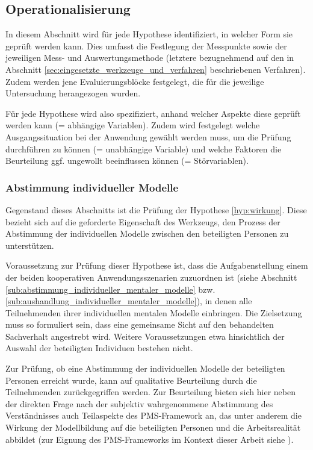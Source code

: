 \subsection{Operationalisierung} %
\label{sub:a_operationalisierung}

In diesem Abschnitt wird für jede Hypothese identifiziert, in welcher Form sie geprüft werden kann. Dies umfasst die Festlegung der Messpunkte sowie der jeweiligen Mess- und Auswertungsmethode (letztere bezugnehmend auf den in Abschnitt \ref{sec:eingesetzte_werkzeuge_und_verfahren} beschriebenen Verfahren). Zudem werden jene Evaluierungsblöcke festgelegt, die für die jeweilige Untersuchung herangezogen wurden.

Für jede Hypothese wird also spezifiziert, anhand welcher Aspekte diese geprüft werden kann (= abhängige Variablen). Zudem wird festgelegt welche Ausgangssituation bei der Anwendung gewählt werden muss, um die Prüfung durchführen zu können (= unabhängige Variable) und welche Faktoren die Beurteilung ggf. ungewollt beeinflussen können (= Störvariablen).

\subsubsection{Abstimmung individueller Modelle} %
\label{ssub:abstimmung_individueller_modelle}

Gegenstand dieses Abschnitts ist die Prüfung der Hypothese \ref{hyp:wirkung}. Diese bezieht sich auf die geforderte Eigenschaft des Werkzeugs, den Prozess der Abstimmung der individuellen Modelle zwischen den beteiligten Personen zu unterstützen.

Voraussetzung zur Prüfung dieser Hypothese ist, dass die Aufgabenstellung einem der beiden kooperativen Anwendungsszenarien zuzuordnen ist (siehe Abschnitt \ref{sub:abstimmung_individueller_mentaler_modelle} bzw. \ref{sub:aushandlung_individueller_mentaler_modelle}), in denen alle Teilnehmenden ihrer individuellen mentalen Modelle einbringen. Die Zielsetzung muss so formuliert sein, dass eine gemeinsame Sicht auf den behandelten Sachverhalt angestrebt wird. Weitere Voraussetzungen etwa hinsichtlich der Auswahl der beteiligten Individuen bestehen nicht.

Zur Prüfung, ob eine Abstimmung der individuellen Modelle der beteiligten Personen erreicht wurde, kann auf qualitative Beurteilung durch die Teilnehmenden zurückgegriffen werden. Zur Beurteilung bieten sich hier neben der direkten Frage nach der subjektiv wahrgenommene Abstimmung des Verständnisses auch Teilaspekte des \gls{PMS}-Framework \citep{Sedera02} an, das unter anderem die Wirkung der Modellbildung auf die beteiligten Personen und die Arbeitsrealität abbildet (zur Eignung des \gls{PMS}-Frameworks im Kontext dieser Arbeit siehe \citep{Wahlmuller10}).

